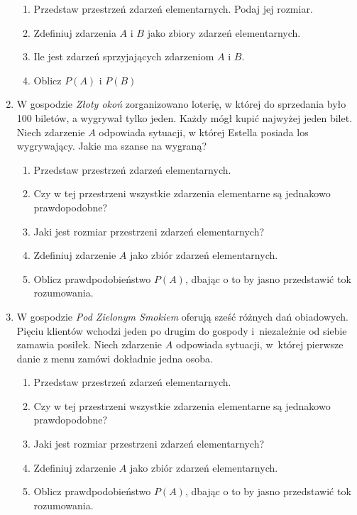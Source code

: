 \documentclass{mwart}
\newcommand{\ans}[1]{}
\begin{document}
\begin{enumerate}
\begin{enumerate}
\item Przedstaw przestrzeń zdarzeń elementarnych. Podaj jej rozmiar. \ans{$\Omega=\{\omega_{\{i,j\}}|i,j\in\{1,\ldots,10\} \land i\neq j\}, \left|\Omega\right|={10 \choose 2}=45$}
\item Zdefiniuj zdarzenia $A$ i $B$ jako zbiory zdarzeń elementarnych. \ans{$A=\{\omega_{\{i,j\}}\in\Omega|i=1 \lor j=1\}$, $B=\{\omega_{\{i,j\}}\in\Omega|i+j>4\}$}
\item Ile jest zdarzeń sprzyjających zdarzeniom $A$ i $B$. \ans{$\left|A\right|=9$, $\left|B\right|=45-4=41$}
\item Oblicz $P(A)$ i $P(B)$ \ans{$P(A)=\frac{9}{45}, P(B)=\frac{41}{45}$}
\end{enumerate}
\item W gospodzie \emph{Złoty okoń} zorganizowano loterię, w której do sprzedania było 100 biletów, a wygrywał tylko jeden. Każdy mógł kupić najwyżej jeden bilet. Niech zdarzenie $A$ odpowiada sytuacji, w której Estella posiada los wygrywający. Jakie ma szanse na wygraną?
\begin{enumerate}%
\item Przedstaw przestrzeń zdarzeń elementarnych. \ans{$\Omega=\{\omega_n|n=1,2,\ldots,100\}$}%
\item Czy w tej przestrzeni wszystkie zdarzenia elementarne są jednakowo prawdopodobne? \ans{Tak}%
\item Jaki jest rozmiar przestrzeni zdarzeń elementarnych? \ans{$\left|\Omega\right|=100$}%
\item Zdefiniuj zdarzenie $A$ jako zbiór zdarzeń elementarnych. \ans{$A=\{\omega_1$\}}%
\item Oblicz prawdpodobieństwo $P(A)$, dbając o to by jasno przedstawić tok rozumowania. \ans{$P(A)=\frac{1}{100}$}%
\end{enumerate}%
\item W gospodzie \emph{Pod Zielonym Smokiem} oferują sześć różnych dań obiadowych. Pięciu klientów wchodzi jeden po drugim do gospody
i~niezależnie od siebie zamawia posiłek. Niech zdarzenie $A$ odpowiada sytuacji, w~której pierwsze danie z menu zamówi dokładnie jedna osoba.%
\begin{enumerate}%
\item Przedstaw przestrzeń zdarzeń elementarnych. \ans{$\Omega=\{\omega_{i_1,\ldots,i_5}|i_j=1,2,\ldots,6\}$}%
\item Czy w tej przestrzeni wszystkie zdarzenia elementarne są jednakowo prawdopodobne? \ans{Tak}%
\item Jaki jest rozmiar przestrzeni zdarzeń elementarnych? \ans{$\left|\Omega\right|=6^5$}%
\item Zdefiniuj zdarzenie $A$ jako zbiór zdarzeń elementarnych. \ans{$A=\{\omega_{i_1,\ldots,i_5}|\exists j: i_j=1 \land \forall k\neq j: i_k\neq 1\}$, $\left|A\right|=5\cdot5^4$}%
\item Oblicz prawdpodobieństwo $P(A)$, dbając o to by jasno przedstawić tok rozumowania. \ans{$P(A)=\frac{5^5}{6^5}=\frac{5}{6}^5\approx 0{,}40$}%
\end{enumerate}%
\end{enumerate}
\clearpage
\end{document}
